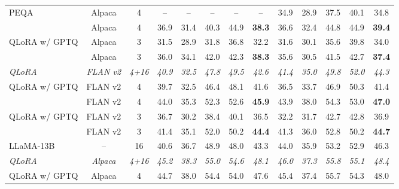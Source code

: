 \begin{table*}[!t]
{{\begin{tabular}{lcc:ccccc:ccccc}
  PEQA         & Alpaca & 4  & -- & -- & -- & -- & -- & 34.9 & 28.9 & 37.5 & 40.1 & 34.8 \\
  \ours{}      & Alpaca & 4  & 36.9 & 31.4 & 40.3 & 44.9 & \textbf{38.3} & 36.6 & 32.4 & 44.8 & 44.9 & \textbf{39.4} \\
  QLoRA w/ GPTQ & Alpaca & 3  & 31.5 & 28.9 & 31.8 & 36.8 & 32.2 & 31.6 & 30.1 & 35.6 & 39.8 & 34.0 \\
  \ours{}      & Alpaca & 3  & 36.0 & 34.1 & 42.0 & 42.3 & \textbf{38.3} & 35.6 & 30.5 & 41.5 & 42.7 & \textbf{37.4} \\
\noalign{\vspace{0.1em}}\hdashline[0.8pt/1pt]\noalign{\vspace{0.1em}}
  \textit{QLoRA} & \textit{FLAN v2} & \textit{4+16} & \textit{40.9} & \textit{32.5} & \textit{47.8} & \textit{49.5} & \textit{42.6} & \textit{41.4} & \textit{35.0} & \textit{49.8} & \textit{52.0} & \textit{44.3} \\
\noalign{\vspace{0.1em}}\hdashline[0.8pt/1pt]\noalign{\vspace{0.1em}}
  QLoRA w/ GPTQ & FLAN v2 & 4  & 39.7 & 32.5 & 46.4 & 48.1 & 41.6 & 36.5 & 33.7 & 46.9 & 50.3 & 41.4 \\
  \ours{}      & FLAN v2 & 4  & 44.0 & 35.3 & 52.3 & 52.6 & \textbf{45.9} & 43.9 & 38.0 & 54.3 & 53.0 & \textbf{47.0} \\
  QLoRA w/ GPTQ & FLAN v2 & 3  & 36.7 & 30.2 & 38.4 & 40.1 & 36.5 & 32.2 & 31.7 & 42.7 & 42.8 & 36.9 \\
  \ours{}      & FLAN v2 & 3  & 41.4 & 35.1 & 52.0 & 50.2 & \textbf{44.4} & 41.3 & 36.0 & 52.8 & 50.2 & \textbf{44.7} \\
\midrule
   LLaMA-13B & -- & 16 & 40.6 & 36.7 & 48.9 & 48.0 & 43.3 & 44.0 & 35.9 & 53.2 & 52.9 & 46.3 \\
\noalign{\vspace{0.1em}}\hdashline[0.8pt/1pt]\noalign{\vspace{0.1em}}
   \textit{QLoRA} & \textit{Alpaca} & \textit{4+16} & \textit{45.2} & \textit{38.3} & \textit{55.0} & \textit{54.6} & \textit{48.1} & \textit{46.0} & \textit{37.3} & \textit{55.8} & \textit{55.1} & \textit{48.4} \\
\noalign{\vspace{0.1em}}\hdashline[0.8pt/1pt]\noalign{\vspace{0.1em}}
   QLoRA w/ GPTQ & Alpaca & 4  & 44.7 & 38.0 & 54.4 & 54.0 & 47.6 & 45.4 & 37.4 & 55.7 & 54.3 & 48.0 \\

\end{tabular}}}
\end{table*}
